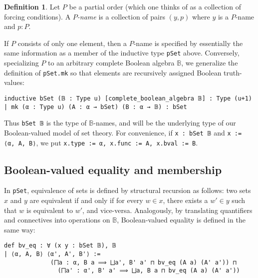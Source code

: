 \documentclass[a4paper,USenglish,cleveref, autoref]{lipics-v2019}
\newcommand{\B}{\mathbb{B}}
\newcommand{\lil}{\lstinline}
\theoremstyle{theorem}
\theoremstyle{definition}
\newtheorem{defn}[definition]{Definition}
\begin{document}
\begin{defn}\label{def-p-name}
Let $P$ be a partial order (which one thinks of as a collection of forcing conditions). A \emph{$P$-name} is a collection of pairs $(y, p)$ where $y$ is a $P$-name and $p : P$.
\end{defn}

 If $P$ consists of only one element, then a $P$-name is specified by essentially the same information as a member of the inductive type \lstinline{pSet} above. Conversely, specializing $P$ to an arbitrary complete Boolean algebra $\B$, we generalize the definition of \lstinline{pSet.mk} so that elements are recursively assigned Boolean truth-values:
\begin{lstlisting}
inductive bSet (𝔹 : Type u) [complete_boolean_algebra 𝔹] : Type (u+1)
| mk (α : Type u) (A : α → bSet) (B : α → 𝔹) : bSet
\end{lstlisting}
Thus \lil{bSet 𝔹} is the type of $\B$-names, and will be the underlying type of our Boolean-valued model of set theory. For convenience, if \lstinline{x : bSet 𝔹} and \lstinline{x := ⟨α, A, B⟩}, we put \lstinline{x.type := α, x.func := A, x.bval := B}.

\subsection{Boolean-valued equality and membership}

In \lil{pSet}, equivalence of sets is defined by structural recursion as follows: two sets $x$ and $y$ are equivalent if and only if for every $w \in x$, there exists a $w' \in y$ such that $w$ is equivalent to $w'$, and vice-versa. Analogously, by translating quantifiers and connectives into operations on $\B$, Boolean-valued equality is defined in the same way:
\begin{lstlisting}
def bv_eq : ∀ (x y : bSet 𝔹), 𝔹
| ⟨α, A, B⟩ ⟨α', A', B'⟩ :=
             (⨅a : α, B a ⟹ ⨆a', B' a' ⊓ bv_eq (A a) (A' a')) ⊓
               (⨅a' : α', B' a' ⟹ ⨆a, B a ⊓ bv_eq (A a) (A' a'))
\end{lstlisting}
\end{document}
